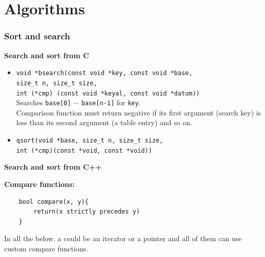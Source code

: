 \section{Algorithms}

\subsubsection{Sort and search}
\textbf{Search and sort from C}
\begin{itemize}
	\item \texttt{void *bsearch(const void *key, const void *base, \\
	size\_t n, size\_t size, \\
	int (*cmp) (const void *keyal, const void *datum))}\\
	Searches \texttt{base[0]} $\cdots$ \texttt{base[n-1]} for \texttt{key}.\\
	Comparison function must return negative if its first argument (search key) is less than its second argument (a table entry) and so on. 

	\item \texttt{qsort(void *base, size\_t n, size\_t size, \\
	int (*cmp)(const *void, const *void))}
\end{itemize}
\textbf{Search and sort from C++}\\

\begin{mdframed}[backgroundcolor=blue!20]
\textbf{Compare functions:}
\vspace{-8pt}
\begin{verbatim}
	bool compare(x, y){
	    return(x strictly precedes y)
	}
\end{verbatim}	
\end{mdframed}

In all the below, a could be an iterator or a pointer and all of them can use custom  compare functions.\\

